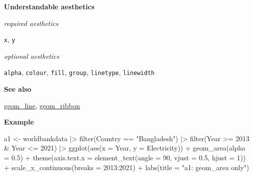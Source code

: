\documentclass[
  letterpaper,
  DIV=11,
  numbers=noendperiod]{scrreprt}
\newenvironment{Shaded}{\begin{snugshade}}{\end{snugshade}}
\newcommand{\AttributeTok}[1]{\textcolor[rgb]{0.40,0.45,0.13}{#1}}
\newcommand{\DecValTok}[1]{\textcolor[rgb]{0.68,0.00,0.00}{#1}}
\newcommand{\FloatTok}[1]{\textcolor[rgb]{0.68,0.00,0.00}{#1}}
\newcommand{\FunctionTok}[1]{\textcolor[rgb]{0.28,0.35,0.67}{#1}}
\newcommand{\NormalTok}[1]{\textcolor[rgb]{0.00,0.23,0.31}{#1}}
\newcommand{\OtherTok}[1]{\textcolor[rgb]{0.00,0.23,0.31}{#1}}
\newcommand{\SpecialCharTok}[1]{\textcolor[rgb]{0.37,0.37,0.37}{#1}}
\newcommand{\StringTok}[1]{\textcolor[rgb]{0.13,0.47,0.30}{#1}}
\begin{document}
\textbf{Understandable aesthetics}

\emph{required aesthetics}

\texttt{x}, \texttt{y}

\emph{optional aesthetics}

\texttt{alpha}, \texttt{colour}, \texttt{fill}, \texttt{group},
\texttt{linetype}, \texttt{linewidth}

\textbf{See also}

\hyperref[line]{geom\_line}, \hyperref[ribbon]{geom\_ribbon}

\textbf{Example}

\begin{Shaded}
\begin{Highlighting}[]
\NormalTok{a1 }\OtherTok{\textless{}{-}}\NormalTok{ worldbankdata }\SpecialCharTok{|\textgreater{}}
  \FunctionTok{filter}\NormalTok{(Country }\SpecialCharTok{==} \StringTok{"Bangladesh"}\NormalTok{) }\SpecialCharTok{|\textgreater{}}
  \FunctionTok{filter}\NormalTok{(Year }\SpecialCharTok{\textgreater{}=} \DecValTok{2013} \SpecialCharTok{\&}\NormalTok{ Year }\SpecialCharTok{\textless{}=} \DecValTok{2021}\NormalTok{) }\SpecialCharTok{|\textgreater{}}
  \FunctionTok{ggplot}\NormalTok{(}\FunctionTok{aes}\NormalTok{(}\AttributeTok{x =}\NormalTok{ Year, }\AttributeTok{y =}\NormalTok{ Electricity)) }\SpecialCharTok{+}
  \FunctionTok{geom\_area}\NormalTok{(}\AttributeTok{alpha =} \FloatTok{0.5}\NormalTok{) }\SpecialCharTok{+}
  \FunctionTok{theme}\NormalTok{(}\AttributeTok{axis.text.x =} \FunctionTok{element\_text}\NormalTok{(}\AttributeTok{angle =} \DecValTok{90}\NormalTok{, }\AttributeTok{vjust =} \FloatTok{0.5}\NormalTok{, }\AttributeTok{hjust =} \DecValTok{1}\NormalTok{)) }\SpecialCharTok{+}
  \FunctionTok{scale\_x\_continuous}\NormalTok{(}\AttributeTok{breaks =} \DecValTok{2013}\SpecialCharTok{:}\DecValTok{2021}\NormalTok{) }\SpecialCharTok{+}
  \FunctionTok{labs}\NormalTok{(}\AttributeTok{title =} \StringTok{"a1: geom\_area only"}\NormalTok{)}


\end{Highlighting}
\end{Shaded}
\end{document}
